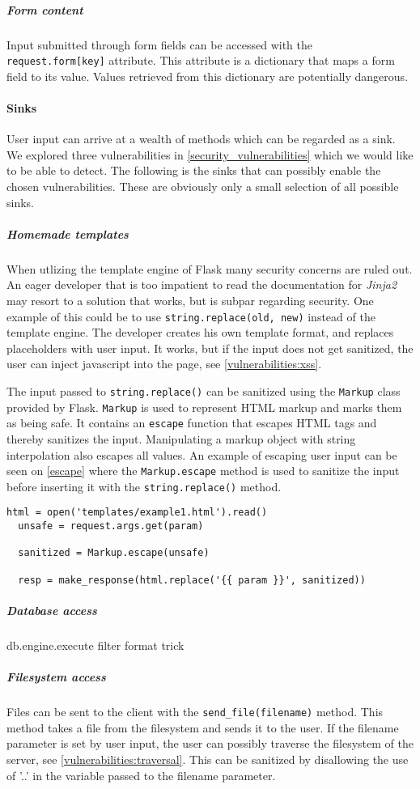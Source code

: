\subparagraph{Form content}
Input submitted through form fields can be accessed with the \texttt{request.form[key]} attribute.
This attribute is a dictionary that maps a form field to its value.
Values retrieved from this dictionary are potentially dangerous.

\paragraph{Sinks}
User input can arrive at a wealth of methods which can be regarded as a sink.
We explored three vulnerabilities in \cref{security_vulnerabilities} which we would like to be able to detect.
The following is the sinks that can possibly enable the chosen vulnerabilities.
These are obviously only a small selection of all possible sinks.

\subparagraph{Homemade templates}
When utlizing the template engine of Flask many security concerns are ruled out.
An eager developer that is too impatient to read the documentation for \emph{Jinja2} may resort to a solution that works, but is subpar regarding security.
One example of this could be to use \texttt{string.replace(old, new)} instead of the template engine.
The developer creates his own template format, and replaces placeholders with user input.
It works, but if the input does not get sanitized, the user can inject javascript into the page, see \cref{vulnerabilities:xss}.

The input passed to \texttt{string.replace()} can be sanitized using the \texttt{Markup} class provided by Flask.
\texttt{Markup} is used to represent HTML markup and marks them as being safe.
It contains an \texttt{escape} function that escapes HTML tags and thereby sanitizes the input.
Manipulating a markup object with string interpolation also escapes all values.
An example of escaping user input can be seen on \cref{escape} where the \texttt{Markup.escape} method is used to sanitize the input before inserting it with the \texttt{string.replace()} method.

\begin{lstlisting}[style=python, caption={An example of escaping user input}, label={escape}]
  html = open('templates/example1.html').read()
  unsafe = request.args.get(param)

  sanitized = Markup.escape(unsafe)
  
  resp = make_response(html.replace('{{ param }}', sanitized))
\end{lstlisting}


\subparagraph{Database access}
db.engine.execute filter format trick

\subparagraph{Filesystem access}
Files can be sent to the client with the \texttt{send\_file(filename)} method.
This method takes a file from the filesystem and sends it to the user.
If the filename parameter is set by user input, the user can possibly traverse the filesystem of the server, see \cref{vulnerabilities:traversal}.
This can be sanitized by disallowing the use of '..' in the variable passed to the filename parameter.
